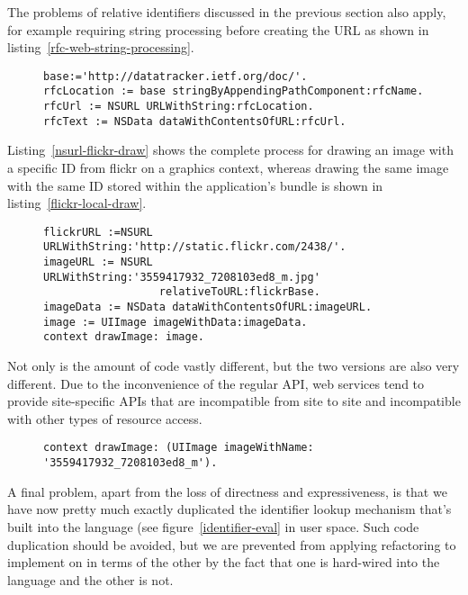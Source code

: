 \documentclass[preprint,authoryear]{llncs}
\begin{document}
The problems of relative identifiers discussed in the previous section also apply, for example requiring
string processing before creating the URL as shown in listing~\ref{rfc-web-string-processing}.  


\begin{figure}[htbp]
\begin{lstlisting}[style=numbers,label=rfc-web-string-processing,caption=Retrieving a specific RFC (I).]
base:='http://datatracker.ietf.org/doc/'.
rfcLocation := base stringByAppendingPathComponent:rfcName.
rfcUrl := NSURL URLWithString:rfcLocation.
rfcText := NSData dataWithContentsOfURL:rfcUrl.
\end{lstlisting}
\end{figure}

 Listing~\ref{nsurl-flickr-draw}
shows the complete process for drawing an image with a specific ID from flickr on a graphics context,
whereas drawing the same image with the same ID stored within the application's bundle
is shown in listing~\ref{flickr-local-draw}.

\begin{figure}[htbp]
\begin{lstlisting}[style=numbers,label=nsurl-flickr-draw,caption=Retrieving and drawing an image stored on flickr.com.]
flickrURL :=NSURL URLWithString:'http://static.flickr.com/2438/'.
imageURL := NSURL URLWithString:'3559417932_7208103ed8_m.jpg' 
                  relativeToURL:flickrBase.
imageData := NSData dataWithContentsOfURL:imageURL.
image := UIImage imageWithData:imageData.
context drawImage: image.
\end{lstlisting}
\end{figure}

Not only is the amount of code vastly different, but the two versions are also very different.  Due to the inconvenience
of the regular API, web services tend to provide site-specific APIs that are incompatible from site to site and 
incompatible with other types of resource access.

\begin{figure}[htbp]
\begin{lstlisting}[style=numbers,label=flickr-local-draw,caption=Retrieving and drawing a local image.]
context drawImage: (UIImage imageWithName: '3559417932_7208103ed8_m').
\end{lstlisting}
\end{figure}

A final problem, apart from the loss of directness and expressiveness, is that we have now pretty
much exactly duplicated the identifier lookup mechanism that's built into the language (see figure~\ref{identifier-eval}
in user space.  Such code duplication should be avoided, but we are prevented from applying refactoring
to implement on in terms of the other by the fact that one is hard-wired into the language and the other is not.
\end{document}
